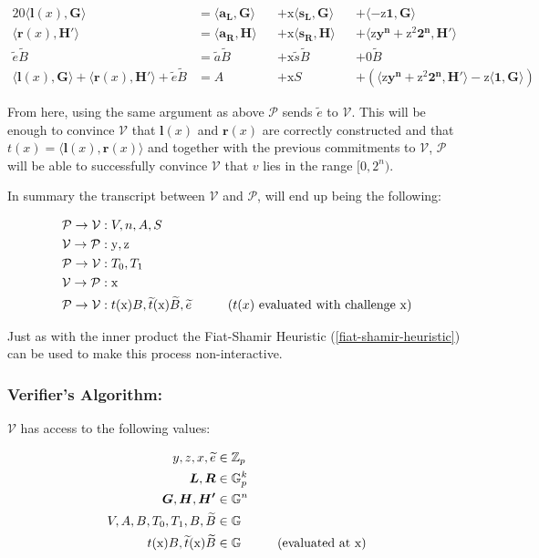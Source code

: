 \documentclass{article}
\newcommand{\eq}[1]{\begin{alignat*}{20}#1\end{alignat*}}
\newcommand{\eqn}[2]{\begin{equation}\label{#1}\begin{split}#2\end{split}\end{equation}}
\renewcommand{\vec}[1]{\boldsymbol{#1}}
\newcommand{\ran}[1]{\mathrm{#1}}
\newcommand{\vecran}[1]{\mathbf{#1}}
\newcommand{\V}{\mathcal{V}}
\renewcommand{\P}{\mathcal{P}}
\newcommand{\G}{\mathbb{G}}
\newcommand{\Z}{\mathbb{Z}}
\newcommand{\tB}{\widetilde{B}}
\renewcommand{\tt}{\widetilde{t}}
\newcommand{\dotp}[2]{\langle #1, #2 \rangle}
\newcommand{\opn}[1]{\operatorname{#1}}
\newcommand{\vecl}[1]{\vec{#1_{\opn{L}}}}
\newcommand{\vecr}[1]{\vec{#1_{\opn{R}}}}
\begin{document}
\eq{
	\dotp{\vec{l}(x)}{\vec{G}} &= \dotp{\vecl{a}}{\vec{G}} &&+ \ran{x}\dotp{\vecl{s}}{\vec{G}} &&+ \dotp{-\ran{z}\vec{1}}{\vec{G}} \\
	\dotp{\vec{r}(x)}{\vec{H'}} &= \dotp{\vecr{a}}{\vec{H}} &&+ \ran{x}\dotp{\vecr{s}}{\vec{H}} &&+ \dotp{\ran{z}\vecran{y^n} + \ran{z^2}\vec{2^n}}{\vec{H'}}\\
	\widetilde{e}\tB &= \widetilde{a}\tB &&+ \ran{x}\widetilde{s}\tB &&+ 0 \tB \\
	\dotp{\vec{l}(x)}{\vec{G}} + \dotp{\vec{r}(x)}{\vec{H'}} + \widetilde{e}\tB &= A &&+ \ran{x}S &&+ (\dotp{\ran{z}\vecran{y^n} + \ran{z^2}\vec{2^n}}{\vec{H'}} - \ran{z}\dotp{\vec{1}}{\vec{G}})
}

From here, using the same argument as above $\P$ sends $\widetilde{e}$ to $\V$. This will be enough to convince $\V$ that $\vec{l}(x)$ and $\vec{r}(x)$ are correctly constructed and that $t(x) = \dotp{\vec{l}(x)}{\vec{r}(x)}$ and together with the previous commitments to $\V$, $\P$ will be able to successfully convince $\V$ that $v$ lies in the range $[0, 2^n)$.

In summary the transcript between $\V$ and $\P$, will end up being the following:

\eq{
	\P \rightarrow \V &: V, n, A, S \\
	\V \rightarrow \P &: \ran{y}, \ran{z} \\
	\P \rightarrow \V &: T_0, T_1 \\
	\V \rightarrow \P &: \ran{x} \\
	\P \rightarrow \V &: t(\ran{x})B, \tt(\ran{x})\tB, \widetilde{e} \hspace*{1cm}\text{($t(x)$ evaluated with challenge $\ran{x}$)}\\
}

Just as with the inner product the Fiat-Shamir Heuristic (\ref{fiat-shamir-heuristic}) can be used to make this process non-interactive.

\subsubsection{Verifier's Algorithm:} \label{verifier-range-proof}

$\V$ has access to the following values:

\eqn{def1-ver}{
	y, z, x, \widetilde{e} &\in \Z_p \\
	\vec{L}, \vec{R} &\in \G_p^{k} \\
	\vec{G}, \vec{H}, \vec{H'} &\in \G^n \\
	V, A, B, T_0, T_1, B, \tB &\in \G \\
	t(\ran{x})B, \tt(\ran{x})\tB &\in \G \hspace*{1cm} \text{(evaluated at x)}
}
\end{document}
